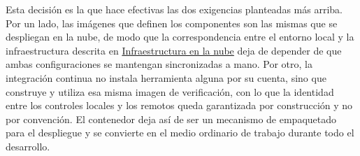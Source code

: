 Esta decisión es la que hace efectivas las dos exigencias planteadas más arriba.
Por un lado, las imágenes que definen los componentes son las mismas que se
despliegan en la nube, de modo que la correspondencia entre el entorno local y
la infraestructura descrita en
\hyperref[sec:infraestructura]{Infraestructura en la nube} deja de depender de
que ambas configuraciones se mantengan sincronizadas a mano. Por otro, la
integración continua no instala herramienta alguna por su cuenta, sino que
construye y utiliza esa misma imagen de verificación, con lo que la identidad
entre los controles locales y los remotos queda garantizada por construcción y
no por convención. El contenedor deja así de ser un mecanismo de empaquetado
para el despliegue y se convierte en el medio ordinario de trabajo durante todo
el desarrollo.
